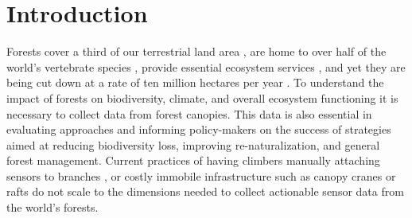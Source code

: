 \section{Introduction}
% 
% 
% 
% 



Forests cover a third of our terrestrial land area \cite{FAO2020a}, are home to over half of the world’s vertebrate species \cite{Pillay2022}, provide essential ecosystem services \cite{Brockerhoff2017}, and yet they are being cut down at a rate of ten million hectares per year \cite{FAO2020a}.
To understand the impact of forests on biodiversity, climate, and overall ecosystem functioning it is necessary to collect data from forest canopies. 
This data is also essential in evaluating approaches and informing policy-makers on the success of strategies aimed at reducing biodiversity loss, improving re-naturalization, and general forest management. Current practices of having climbers manually attaching sensors to branches \cite{Anderson2020a}, or costly immobile  infrastructure such as canopy cranes or rafts \cite{Cannon2021} do not scale to the dimensions needed to collect actionable sensor data from the world’s forests. 

